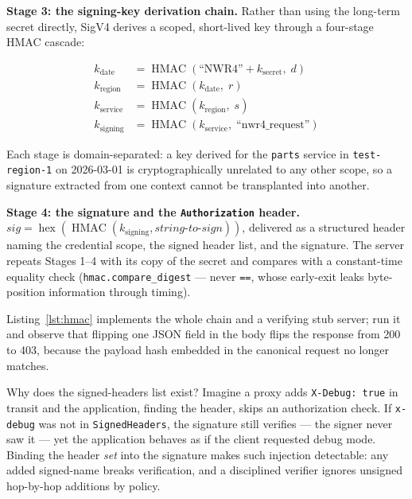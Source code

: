 \textbf{Stage 3: the signing-key derivation chain.} Rather than using the
long-term secret directly, SigV4 derives a scoped, short-lived key through
a four-stage HMAC cascade:

\begin{align*}
k_{\text{date}} &= \operatorname{HMAC}(\text{``NWR4''} + k_{\text{secret}},\; d)\\
k_{\text{region}} &= \operatorname{HMAC}(k_{\text{date}},\; r)\\
k_{\text{service}} &= \operatorname{HMAC}(k_{\text{region}},\; s)\\
k_{\text{signing}} &= \operatorname{HMAC}(k_{\text{service}},\; \text{``nwr4\_request''})
\end{align*}

Each stage is domain-separated: a key derived for the \texttt{parts} service
in \texttt{test-region-1} on 2026-03-01 is cryptographically unrelated to
any other scope, so a signature extracted from one context cannot be
transplanted into another.

\textbf{Stage 4: the signature and the \texttt{Authorization} header.}
$\textit{sig} = \operatorname{hex}(\operatorname{HMAC}(k_{\text{signing}}, \textit{string-to-sign}))$,
delivered as a structured header naming the credential scope, the signed
header list, and the signature. The server repeats Stages 1--4 with its copy
of the secret and compares with a constant-time equality check
(\texttt{hmac.compare\_digest} --- never \texttt{==}, whose early-exit leaks
byte-position information through timing).

Listing~\ref{lst:hmac} implements the whole chain and a verifying stub
server; run it and observe that flipping one JSON field in the body flips
the response from 200 to 403, because the payload hash embedded in the
canonical request no longer matches.

\begin{examplebox}
Why does the signed-headers list exist? Imagine a proxy adds
\texttt{X-Debug: true} in transit and the application, finding the header,
skips an authorization check. If \texttt{x-debug} was not in
\texttt{SignedHeaders}, the signature still verifies --- the signer never
saw it --- yet the application behaves as if the client requested debug
mode. Binding the header \emph{set} into the signature makes such injection
detectable: any added signed-name breaks verification, and a disciplined
verifier ignores unsigned hop-by-hop additions by policy.
\end{examplebox}

